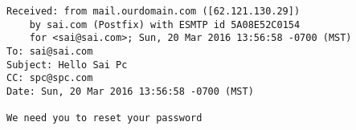 \begin{lstlisting}
Received: from mail.ourdomain.com ([62.121.130.29])
	by sai.com (Postfix) with ESMTP id 5A08E52C0154
	for <sai@sai.com>; Sun, 20 Mar 2016 13:56:58 -0700 (MST)
To: sai@sai.com
Subject: Hello Sai Pc
CC: spc@spc.com
Date: Sun, 20 Mar 2016 13:56:58 -0700 (MST)

We need you to reset your password
\end{lstlisting}